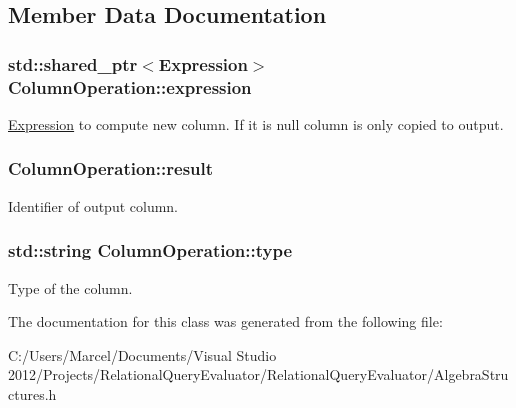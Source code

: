 \subsection{Member Data Documentation}
\hypertarget{class_column_operation_a4d5d373009098230cb3a2bfa3aa3cc33}{
\subsubsection[{expression}]{\setlength{\rightskip}{0pt plus 5cm}std\+::shared\+\_\+ptr$<${\bf Expression}$>$ Column\+Operation\+::expression}}\label{class_column_operation_a4d5d373009098230cb3a2bfa3aa3cc33}
\hyperlink{class_expression}{Expression} to compute new column. If it is null column is only copied to output. \hypertarget{class_column_operation_aab22c48d83db533c5b153136a4da6db7}{
\subsubsection[{result}]{ Column\+Operation\+::result}}\label{class_column_operation_aab22c48d83db533c5b153136a4da6db7}
Identifier of output column. \hypertarget{class_column_operation_ae04fd07588173c74291e80032f80f991}{
\subsubsection[{type}]{\setlength{\rightskip}{0pt plus 5cm}std\+::string Column\+Operation\+::type}}\label{class_column_operation_ae04fd07588173c74291e80032f80f991}
Type of the column. 

The documentation for this class was generated from the following file\+:\begin{DoxyCompactItemize}
\item 
C\+:/\+Users/\+Marcel/\+Documents/\+Visual Studio 2012/\+Projects/\+Relational\+Query\+Evaluator/\+Relational\+Query\+Evaluator/Algebra\+Structures.\+h\end{DoxyCompactItemize}
